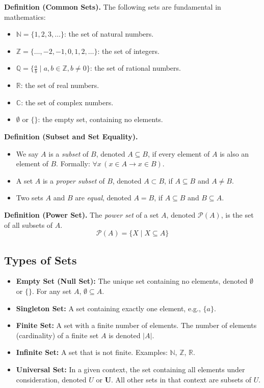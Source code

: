 \documentclass[11pt,a4paper]{article}
\begin{document}
\textbf{Definition (Common Sets).} The following sets are fundamental in mathematics:
\begin{itemize}[label=--]
    \item $\mathbb{N} = \{1, 2, 3, \dots\}$: the set of natural numbers.
    \item $\mathbb{Z} = \{\dots, -2, -1, 0, 1, 2, \dots\}$: the set of integers.
    \item $\mathbb{Q} = \{\frac{a}{b} \mid a, b \in \mathbb{Z}, b \neq 0\}$: the set of rational numbers.
    \item $\mathbb{R}$: the set of real numbers.
    \item $\mathbb{C}$: the set of complex numbers.
    \item $\emptyset$ or $\{\}$: the empty set, containing no elements.
\end{itemize}

\textbf{Definition (Subset and Set Equality).}
\begin{itemize}
    \item We say $A$ is a \textit{subset} of $B$, denoted $A \subseteq B$, if every element of $A$ is also an element of $B$. Formally: $\forall x\,(x \in A \to x \in B)$.
    \item A set $A$ is a \textit{proper subset} of $B$, denoted $A \subset B$, if $A \subseteq B$ and $A \neq B$.
    \item Two sets $A$ and $B$ are \textit{equal}, denoted $A = B$, if $A \subseteq B$ and $B \subseteq A$.
\end{itemize}

\textbf{Definition (Power Set).} The \textit{power set} of a set $A$, denoted $\mathcal{P}(A)$, is the set of all subsets of $A$.
\begin{equation*}
    \mathcal{P}(A) = \{X \mid X \subseteq A\}
\end{equation*}

\subsection{Types of Sets}

\begin{itemize}[label=\(\triangleright\)]
    \item \textbf{Empty Set (Null Set):} The unique set containing no elements, denoted $\emptyset$ or $\{\}$. For any set $A$, $\emptyset \subseteq A$.
    \item \textbf{Singleton Set:} A set containing exactly one element, e.g., $\{a\}$.
    \item \textbf{Finite Set:} A set with a finite number of elements. The number of elements (cardinality) of a finite set $A$ is denoted $|A|$.
    \item \textbf{Infinite Set:} A set that is not finite. Examples: $\mathbb{N}$, $\mathbb{Z}$, $\mathbb{R}$.
    \item \textbf{Universal Set:} In a given context, the set containing all elements under consideration, denoted $U$ or $\mathbf{U}$. All other sets in that context are subsets of $U$.
\end{itemize}
\end{document}
